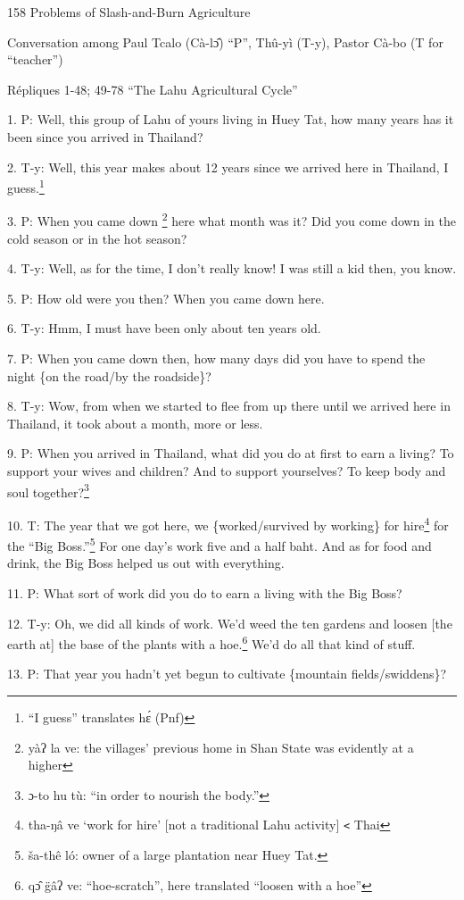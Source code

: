 
158 Problems of Slash-and-Burn Agriculture

Conversation among Paul Tcalo (Cà-lɔ̂) ``P'', Thû-yì (T-y), Pastor Cà-bo
(T for ``teacher'')

Répliques 1-48; 49-78 ``The Lahu Agricultural Cycle''

1. P: Well, this group of Lahu of yours living in Huey Tat, how many years has
it been since you arrived in Thailand?

2. T-y: Well, this year makes about 12 years since we arrived here in Thailand,
I guess.\footnote{``I guess'' translates hɛ́ (Pnf)}

3. P: When you came down \footnote{yàʔ la ve: the villages' previous home in Shan State was evidently at a higher} here what month was it? Did you come down in the cold
season or in the hot season?

4. T-y: Well, as for the time, I don't really know! I was still a kid then, you
know.

5. P: How old were you then? When you came down here.

6. T-y: Hmm, I must have been only about ten years old.

7. P: When you came down then, how many days did you have to spend the night \{on
the road/by the roadside\}?

8. T-y: Wow, from when we started to flee from up there until we arrived here in
Thailand, it took about a month, more or less.

9. P: When you arrived in Thailand, what did you do at first to earn a living?
To support your wives and children? And to support yourselves? To keep body and
soul together?\footnote{ɔ-to hu tù: ``in order to nourish the body.''}

10. T: The year that we got here, we \{worked/survived by working\} for hire\footnote{tha-ŋâ ve `work for hire' [not a traditional Lahu activity] \texttt{<} Thai}
for the ``Big Boss.''\footnote{ša-thê ló: owner of a large plantation near Huey Tat.} For one day's work five and a half baht. And as for food
and drink, the Big Boss helped us out with everything.

11. P: What sort of work did you do to earn a living with the Big Boss?

12. T-y: Oh, we did all kinds of work. We'd weed the ten gardens and loosen [the
earth at] the base of the plants with a hoe.\footnote{qɔ̂ g̈âʔ ve: ``hoe-scratch'', here translated ``loosen with a hoe''} We'd do all that kind of stuff.

13. P: That year you hadn't yet begun to cultivate \{mountain fields/swiddens\}?

